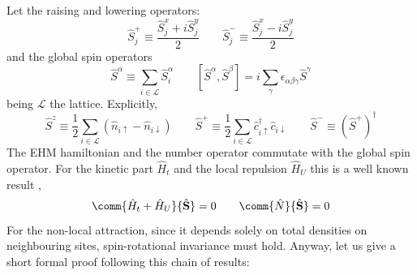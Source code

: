 Let the raising and lowering operators:
\[
	\hat S_j^+ \equiv \frac{\hat S_j^x + i\hat S_j^y}{2}
	\qquad
	\hat S_j^- \equiv \frac{\hat S_j^x - i\hat S_j^y}{2}
\]
and the global spin operators
\[
	\hat S^\alpha \equiv \sum_{i \in \mathcal{L}} \hat S_i^\alpha
	\qquad
	\left[ \hat S^\alpha, \hat S^\beta \right] = i \sum_\gamma \epsilon_{\alpha\beta\gamma} \hat S^\gamma
\]
being $\mathcal{L}$ the lattice. Explicitly,
\[
	\hat S^z \equiv \frac{1}{2} \sum_{i \in \mathcal{L}} \left(
		\hat n_{i\uparrow} - \hat n_{i\downarrow}
	\right)
	\qquad
	\hat S^+ \equiv \frac{1}{2} \sum_{i \in \mathcal{L}} \hat c_{i\uparrow}^\dagger \hat c_{i\downarrow}
	\qquad
	\hat S^- \equiv \left( \hat S^+ \right)^\dagger
\]
The EHM hamiltonian and the number operator commutate with the global spin operator. For the kinetic part $\hat H_t$ and the local repulsion $\hat H_U$ this is a well known result \cite{arovas2022hubbard,pavarini2015many},
\[
	\comm{\hat H_t + \hat H_U}{\hat{\mathbf{S}}} = 0
	\qquad
	\comm{\hat N}{\hat{\mathbf{S}}} = 0
\]
For the non-local attraction, since it depends solely on total densities on neighbouring sites, spin-rotational invariance must hold. Anyway, let us give a short formal proof following this chain of results:
